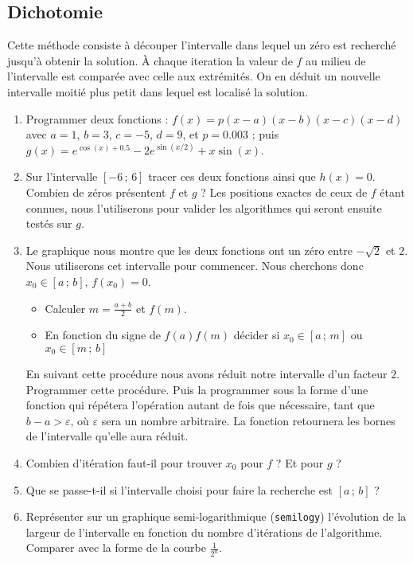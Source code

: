 \subsection{Dichotomie}
Cette méthode consiste à découper l'intervalle dans lequel 
un zéro est recherché jusqu'à obtenir la solution. À chaque iteration
la valeur de $f$ au milieu de l'intervalle est comparée avec celle aux extrémités. On en déduit un nouvelle intervalle moitié plus petit dans lequel est localisé la solution. 
\begin{enumerate}
\item Programmer deux fonctions : 
$f(x) = p(x-a)(x-b)(x-c)(x-d)$ avec $a=1$, $b=3$, $c=-5$, $d=9$, et $p=0.003$ ;
puis $g(x) = e^{\cos (x) + 0.5} - 2 e^{\sin(x/2)}+x\sin(x)$.
\item Sur l'intervalle $[-6\,;\,6]$ tracer ces deux fonctions ainsi 
que $h(x)=0$. Combien de zéros présentent $f$ et $g$ ? Les positions exactes 
de ceux de $f$ étant connues, nous l'utiliserons pour valider les algorithmes 
qui seront ensuite testés sur $g$. 
\item Le graphique nous montre que les deux fonctions ont un zéro entre $-\sqrt{2}$ et $2$. Nous utiliserons cet intervalle pour commencer. Nous cherchons donc $x_0 \in [a\,;\,b], \, f(x_0)=0$. 
\begin{itemize}
\item Calculer $m=\frac{a+b}{2}$ et $f(m)$.
\item En fonction du signe de $f(a)f(m)$ décider si   $x_0 \in [a\,;\,m]$  ou  $x_0 \in [m\,;\,b]$
\end{itemize}
 En suivant cette procédure nous avons réduit notre intervalle d'un facteur $2$. 
Programmer cette procédure. Puis la programmer sous la forme 
d'une fonction qui répétera l'opération autant de fois que nécessaire, tant que $b-a > \varepsilon $, où $\varepsilon$ sera un nombre arbitraire. La fonction retournera
les bornes de l'intervalle qu'elle aura réduit. 
\item Combien d'itération faut-il pour trouver $x_0$ pour $f$ ? Et pour $g$ ? 
\item Que se passe-t-il si l'intervalle choisi pour faire la recherche est 
 $[a\,;\,b]$ ?
\item Représenter sur un graphique semi-logarithmique ({\tt semilogy}) 
l'évolution de la largeur de l'intervalle
en fonction du nombre d'itérations de l'algorithme. Comparer avec la forme
de la courbe $\frac{1}{2^n}$. 
\end{enumerate} 
